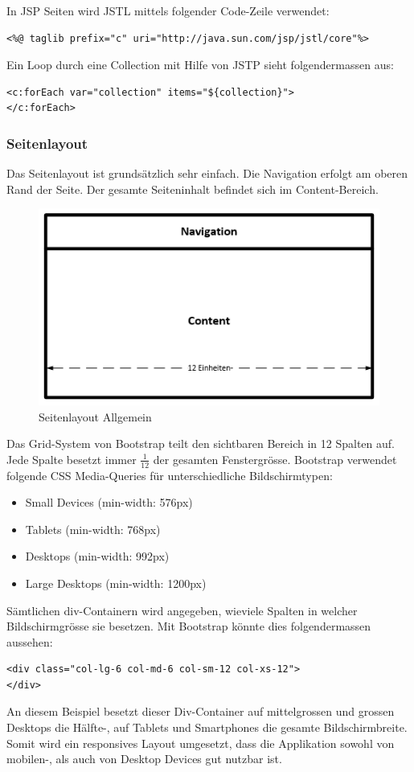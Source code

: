 In JSP Seiten wird JSTL mittels folgender Code-Zeile verwendet:
\begin{lstlisting}[language=html5]
<%@ taglib prefix="c" uri="http://java.sun.com/jsp/jstl/core"%>
\end{lstlisting}

Ein Loop durch eine Collection mit Hilfe von JSTP sieht folgendermassen aus:
\begin{lstlisting}[language=html5]
<c:forEach var="collection" items="${collection}">
</c:forEach>
\end{lstlisting}
 \newpage

\subsubsection{Seitenlayout}
Das Seitenlayout ist grundsätzlich sehr einfach. Die Navigation erfolgt am oberen Rand der Seite. Der gesamte Seiteninhalt befindet sich im Content-Bereich. 
\begin{figure}[H]
\centering
\includegraphics[scale=0.9]{../04_Realisierung/images/userinterface/seitenlayout_allgemein_large.png}
\caption{Seitenlayout Allgemein}
\end{figure}
Das Grid-System von Bootstrap teilt den sichtbaren Bereich in 12 Spalten auf. Jede Spalte besetzt immer $\frac{1}{12}$ der gesamten Fenstergrösse. Bootstrap verwendet folgende CSS Media-Queries für unterschiedliche Bildschirmtypen:
\begin{itemize}
\item Small Devices (min-width: 576px)
\item Tablets (min-width: 768px)
\item Desktops (min-width: 992px)
\item Large Desktops (min-width: 1200px)
\end{itemize}
Sämtlichen div-Containern wird angegeben, wieviele Spalten in welcher Bildschirmgrösse sie besetzen. Mit Bootstrap könnte dies folgendermassen aussehen: 
\begin{lstlisting}[language=html5]
<div class="col-lg-6 col-md-6 col-sm-12 col-xs-12">
</div>
\end{lstlisting}
An diesem Beispiel besetzt dieser Div-Container auf mittelgrossen und grossen Desktops die Hälfte-, auf Tablets und Smartphones die gesamte Bildschirmbreite. Somit wird ein responsives Layout umgesetzt, dass die Applikation sowohl von mobilen-, als auch von Desktop Devices gut nutzbar ist.
 \newpage

